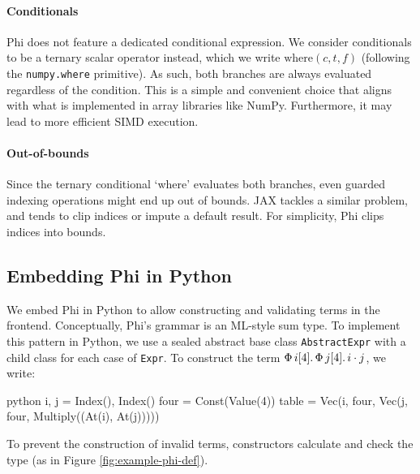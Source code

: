 \paragraph{Conditionals} Phi does not feature a dedicated conditional expression. We consider conditionals to be a ternary scalar operator instead, which we write $\mathrm{where}(c, t, f)$ (following the \texttt{numpy.where} primitive). As such, both branches are always evaluated regardless of the condition. 
This is a simple and convenient choice that aligns with what is implemented in array libraries like NumPy. Furthermore, it may lead to more efficient SIMD execution.

\paragraph{Out-of-bounds} Since the ternary conditional `where' evaluates both branches, even guarded indexing operations might end up out of bounds. 
JAX tackles a similar problem, 
and tends to clip indices or impute a default result. 
For simplicity, Phi clips indices into bounds.


\subsection{Embedding Phi in Python}
\label{embedding-phi}

We embed Phi in Python to allow constructing and validating terms in the frontend. Conceptually, Phi's grammar is an ML-style sum type. To implement this pattern in Python, we use a sealed abstract base class \texttt{AbstractExpr} with a child class for each case of \texttt{Expr}. To construct the term $\Phi\, {i}[{4}] \ldotp {\Phi\, {j}[{4}] \ldotp {i \cdot j}}$, we write:
\begin{center}
\begin{cminted}{python}
i, j = Index(), Index()
four = Const(Value(4))
table = Vec(i, four, Vec(j, four, Multiply((At(i), At(j)))))
\end{cminted}
\end{center}
To prevent the construction of invalid terms, constructors calculate and check the type (as in Figure \ref{fig:example-phi-def}).

